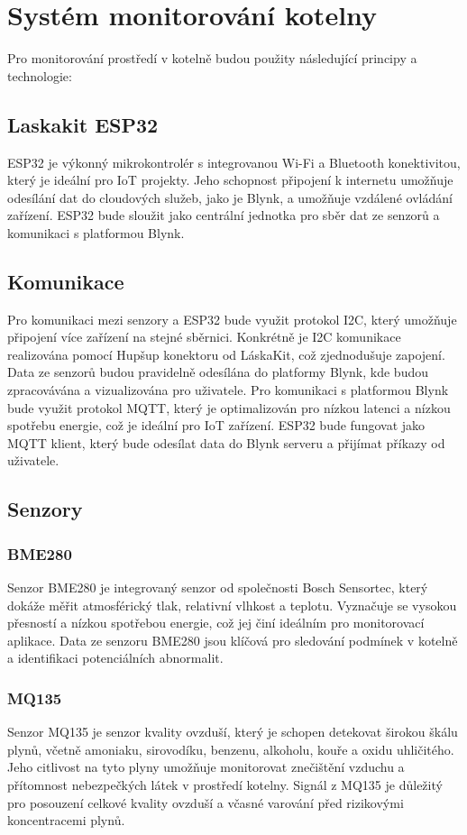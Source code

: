 \documentclass[12pt, twoside]{article} %
\begin{document}
\newpage

\section{Systém monitorování kotelny}
Pro monitorování prostředí v kotelně budou použity následující principy a technologie:
\subsection{Laskakit ESP32}
ESP32 je výkonný mikrokontrolér s integrovanou Wi-Fi a Bluetooth konektivitou, který je ideální pro IoT projekty. Jeho schopnost připojení k internetu umožňuje odesílání dat do cloudových služeb, jako je Blynk, a umožňuje vzdálené ovládání zařízení. ESP32 bude sloužit jako centrální jednotka pro sběr dat ze senzorů a komunikaci s platformou Blynk. \autocite{laskakit_esp32}
\subsection{Komunikace}
Pro komunikaci mezi senzory a ESP32 bude využit protokol I2C, který umožňuje připojení více zařízení na stejné sběrnici. Konkrétně je I2C komunikace realizována pomocí Hupšup konektoru od LáskaKit, což zjednodušuje zapojení. Data ze senzorů budou pravidelně odesílána do platformy Blynk, kde budou zpracovávána a vizualizována pro uživatele.
Pro komunikaci s platformou Blynk bude využit protokol MQTT, který je optimalizován pro nízkou latenci a nízkou spotřebu energie, což je ideální pro IoT zařízení. ESP32 bude fungovat jako MQTT klient, který bude odesílat data do Blynk serveru a přijímat příkazy od uživatele. \autocite{blynk_docs}
\subsection{Senzory}
\subsubsection{BME280}
Senzor BME280 je integrovaný senzor od společnosti Bosch Sensortec, který dokáže měřit atmosférický tlak, relativní vlhkost a teplotu. Vyznačuje se vysokou přesností a nízkou spotřebou energie, což jej činí ideálním pro monitorovací aplikace. Data ze senzoru BME280 jsou klíčová pro sledování podmínek v kotelně a identifikaci potenciálních abnormalit.
\subsubsection{MQ135}
Senzor MQ135 je senzor kvality ovzduší, který je schopen detekovat širokou škálu plynů, včetně amoniaku, sirovodíku, benzenu, alkoholu, kouře a oxidu uhličitého. Jeho citlivost na tyto plyny umožňuje monitorovat znečištění vzduchu a přítomnost nebezpečkých látek v prostředí kotelny. Signál z MQ135 je důležitý pro posouzení celkové kvality ovzduší a včasné varování před rizikovými koncentracemi plynů. \autocite{dratek_mq135}
\end{document}
